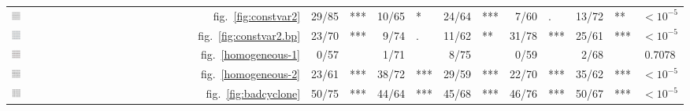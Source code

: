 \documentclass[12pt]{article} %
\begin{document}
\begin{table}[ht]
\begin{tabular}{Mrrlrlrlrlrlc}
\includegraphics[width=0.05\textwidth]{dialyzerheterogeneous-icon}& fig.~\ref{fig:constvar2} & 29/85&\hspace{-0.1in}***  & 10/65&\hspace{-0.1in}* & 24/64&\hspace{-0.1in}*** & 7/60&\hspace{-0.1in}. & 13/72&\hspace{-0.1in}** & $<10^{-5}$\\ 
\includegraphics[width=0.05\textwidth]{dialyzerheterogeneous-bp} &  fig.~\ref{fig:constvar2.bp} & 23/70 & \hspace{-0.1in}*** & 9/74 & \hspace{-0.1in}. & 11/62 & \hspace{-0.1in}** & 31/78 & \hspace{-0.1in}*** & 25/61 & \hspace{-0.1in}*** & $<10^{-5}$\\ 
%
 \includegraphics[width=0.05\textwidth]{homogeneous-dots-icon} & fig.~\ref{homogeneous-1}& 0/57 & \hspace{-0.1in}  & 1/71 & \hspace{-0.1in}  & 8/75 & \hspace{-0.1in}  & 0/59 & \hspace{-0.1in}  & 2/68 & \hspace{-0.1in}  & 0.7078 \\ 
\includegraphics[width=0.05\textwidth]{homogeneous-bp-icon} &  fig.~\ref{homogeneous-2}& 23/61 & \hspace{-0.1in}*** & 38/72 & \hspace{-0.1in}*** & 29/59 & \hspace{-0.1in}*** & 22/70 & \hspace{-0.1in}*** & 35/62 & \hspace{-0.1in}*** & $<10^{-5}$\\ 
%
\includegraphics[width=0.05\textwidth]{cyclone-icon}&   fig.~\ref{fig:badcyclone} & 50/75&\hspace{-0.1in}***  & 44/64&\hspace{-0.1in}*** & 45/68&\hspace{-0.1in}*** & 46/76&\hspace{-0.1in}*** & 50/67&\hspace{-0.1in}*** & $<10^{-5}$\\ 

\end{tabular}
\end{table}
\end{document}
